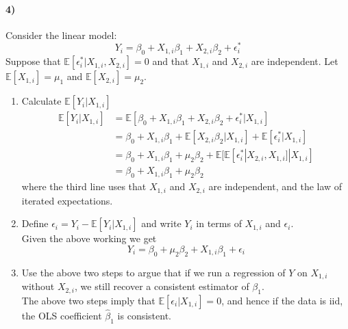 \documentclass[12pt]{article}
\newcommand\EE{\mathbb{E}}
\newcommand\h{\hat}
\newcommand\eps{\epsilon}
\numberwithin{equation}{section}
\numberwithin{figure}{section}
\numberwithin{table}{section}
\begin{document}
\paragraph{4)} Consider the linear model:
\[ Y_i = \beta_0 + X_{1,i}\beta_1 + X_{2,i}\beta_2 + \eps^*_i \]
Suppose that $\EE[\eps^*_i|X_{1,i},X_{2,i}] = 0$ and that $X_{1,i}$ and $X_{2,i}$ are independent. Let $\EE[X_{1,i}]=\mu_1$ and $\EE[X_{2,i}]=\mu_2$.
\begin{enumerate}
\item Calculate $\EE[Y_i|X_{1,i}]$ {\color{blue}
  \begin{align*}
    \EE[Y_i|X_{1,i}] &= \EE[\beta_0 + X_{1,i}\beta_1 + X_{2,i}\beta_2 + \eps^*_i|X_{1,i}] \\
                     &= \beta_0 + X_{1,i}\beta_1 + \EE[X_{2,i}\beta_2|X_{1,i}] + \EE[\eps^*_i|X_{1,i}] \\
                     &=  \beta_0 + X_{1,i}\beta_1 + \mu_2\beta_2 + \EE[\EE[\eps^*_i|X_{2,i},X_{1,i}]|X_{1,i}] \\
                     &= \beta_0 + X_{1,i}\beta_1 + \mu_2\beta_2
  \end{align*}
  where the third line uses that $X_{1,i}$ and $X_{2,i}$ are independent, and the law of iterated expectations.}
\item Define $\eps_i = Y_i-\EE[Y_i|X_{1,i}]$ and write $Y_i$ in terms of $X_{1,i}$ and $\eps_{i}$. \\
  {\color{blue} Given the above working we get
    \[Y_{i} = \beta_0 + \mu_2\beta_2 + X_{1,i}\beta_1 + \eps_i \]
    }
  \item Use the above two steps to argue that if we run a regression of $Y$ on $X_{1,i}$ without $X_{2,i}$, we still recover a consistent estimator of $\beta_1$. \\
    {\color{blue} The above two steps imply that $\EE[\eps_i|X_{1,i}]=0$, and hence if the data is iid, the OLS coefficient $\h{\beta}_1$ is consistent.}
\end{enumerate}
\end{document}
